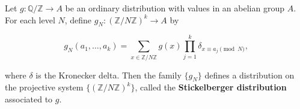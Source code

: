 Let $g: \mathbb{Q}/\mathbb{Z} \to A$ be an ordinary distribution with values in an
abelian group $A$. For each level $N$, define $g_N: (\mathbb{Z}/N\mathbb{Z})^k \to A$
by

$$g_N(a_1, \ldots, a_k) = \sum_{x \in \mathbb{Z}/N\mathbb{Z}} g(x) \prod_{j=1}^{k} \delta_{x \equiv a_j \pmod{N}},$$

where $\delta$ is the Kronecker delta. Then the family $\{g_N\}$ defines a distribution
on the projective system $\{(\mathbb{Z}/N\mathbb{Z})^k\}$, called the
\textbf{Stickelberger distribution} associated to $g$.
